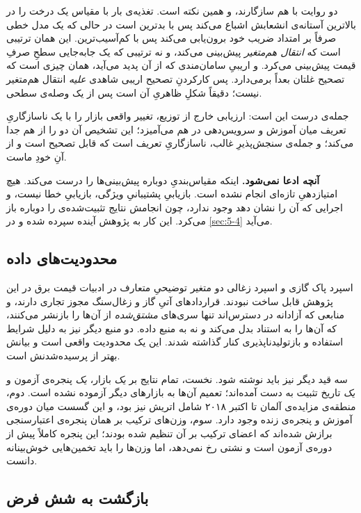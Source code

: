 دو روایت با هم سازگارند، و همین نکته است. تغذیه‌ی بار با مقیاس  یک
درخت را در بالاترین آستانه‌ی انشعابش اشباع می‌کند  پس  با
 بدترین است  در حالی که یک مدل خطی صرفاً بر امتداد ضریب خود
برون‌یابی می‌کند  پس  با  کم‌آسیب‌ترین. این
همان ترتیبی است که \emph{انتقال هم‌متغیر} پیش‌بینی می‌کند، و نه ترتیبی که یک
جابه‌جایی سطحِ صرفِ قیمت پیش‌بینی می‌کرد. و اریبیِ سامان‌مندی که از آن پدید
می‌آید، همان چیزی است که تصحیح غلتان بعداً برمی‌دارد. پس کارکردنِ تصحیح اریبی
شاهدی \emph{علیه} انتقال هم‌متغیر نیست؛ دقیقاً شکلِ ظاهریِ آن است پس از یک
وصله‌ی سطحی.

جمله‌ی درست این است: ارزیابی خارج از توزیع، تغییر واقعی بازار را با یک
ناسازگاریِ تعریف میان آموزش و سرویس‌دهی در هم می‌آمیزد؛ این تشخیص آن دو را از هم
جدا می‌کند؛ و جمله‌ی سنجش‌پذیرِ غالب، ناسازگاریِ تعریف است  که قابل تصحیح
است و از آنِ خودِ ماست.

\textbf{آنچه ادعا نمی‌شود.} اینکه مقیاس‌بندیِ دوباره پیش‌بینی‌ها را درست می‌کند.
هیچ امتیازدهیِ تازه‌ای انجام نشده است. بازیابیِ پشتیبانیِ ویژگی، بازیابیِ خطا
نیست، و اجرایی که آن را نشان دهد وجود ندارد، چون انجامش نتایج تثبیت‌شده‌ی
 را دوباره باز می‌کرد. این کار به پژوهش آینده سپرده شده و در
\cref{sec:5-4} می‌آید.

\subsection*{محدودیت‌های داده}

اسپرد پاک گازی و اسپرد زغالی  دو متغیر توضیحیِ متعارف در ادبیات قیمت برق
 در این پژوهش قابل ساخت نبودند. قراردادهای آتیِ گاز و زغال‌سنگ مجوز
تجاری دارند، و منابعی که آزادانه در دسترس‌اند تنها سری‌های \emph{مشتق‌شده} از
آن‌ها را بازنشر می‌کنند، که آن‌ها را به استناد بدل می‌کند و نه به منبع داده. دو
منبع دیگر نیز به دلیل شرایط استفاده و بازتولیدناپذیری کنار گذاشته شدند. این یک
محدودیت واقعی است و بیانش بهتر از پرسیده‌شدنش است.

سه قید دیگر نیز باید نوشته شود. نخست، تمام نتایج بر \emph{یک} بازار، \emph{یک}
پنجره‌ی آزمون و \emph{یک} تاریخ تثبیت به دست آمده‌اند؛ تعمیم آن‌ها به بازارهای
دیگر آزموده نشده است. دوم، منطقه‌ی مزایده‌ی آلمان تا اکتبر ۲۰۱۸ شامل اتریش نیز
بود، و این گسست میان دوره‌ی آموزش و پنجره‌ی زنده وجود دارد. سوم، وزن‌های ترکیب بر
همان پنجره‌ی اعتبارسنجی برازش شده‌اند که اعضای ترکیب بر آن تنظیم شده بودند؛ این
پنجره کاملاً پیش از دوره‌ی آزمون است و نشتی رخ نمی‌دهد، اما وزن‌ها را باید
تخمین‌هایی خوش‌بینانه دانست.

\subsection*{بازگشت به شش فرض}

